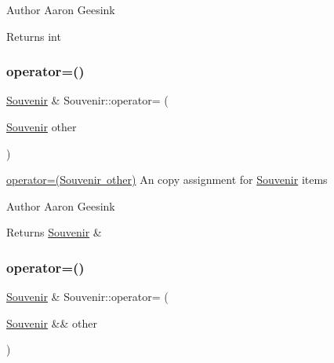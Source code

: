 \begin{DoxyAuthor}{Author}
Aaron Geesink 
\end{DoxyAuthor}
\begin{DoxyReturn}{Returns}
int 
\end{DoxyReturn}
\mbox{\label{class_souvenir_a546832baf66c42db5b75f7325572c4df}} 
\subsubsection{\texorpdfstring{operator=()}{operator=()}\hspace{0.1cm}{\footnotesize\ttfamily [1/2]}}
{\footnotesize\ttfamily \mbox{\hyperlink{class_souvenir}{Souvenir}} \& Souvenir\+::operator= (\begin{DoxyParamCaption}\item[{\mbox{\hyperlink{class_souvenir}{Souvenir}}}]{other }\end{DoxyParamCaption})}



\mbox{\hyperlink{class_souvenir_a546832baf66c42db5b75f7325572c4df}{operator=(\+Souvenir other)}} An copy assignment for \mbox{\hyperlink{class_souvenir}{Souvenir}} items 

\begin{DoxyAuthor}{Author}
Aaron Geesink 
\end{DoxyAuthor}
\begin{DoxyReturn}{Returns}
\mbox{\hyperlink{class_souvenir}{Souvenir}} \& 
\end{DoxyReturn}
\mbox{\label{class_souvenir_ac455fa569cbb12dc51d2b618f5000576}} 
\subsubsection{\texorpdfstring{operator=()}{operator=()}\hspace{0.1cm}{\footnotesize\ttfamily [2/2]}}
{\footnotesize\ttfamily \mbox{\hyperlink{class_souvenir}{Souvenir}} \& Souvenir\+::operator= (\begin{DoxyParamCaption}\item[{\mbox{\hyperlink{class_souvenir}{Souvenir}} \&\&}]{other }\end{DoxyParamCaption})}



